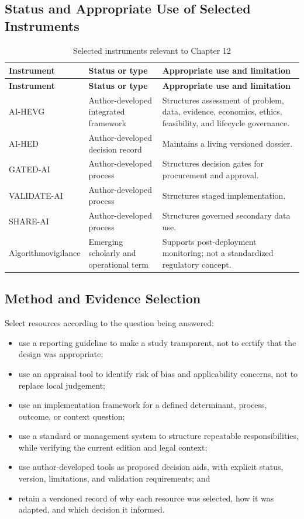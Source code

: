 \subsection{Status and Appropriate Use of Selected Instruments}
\begin{longtable}{@{}p{}p{}p{}@{}}
\caption{Selected instruments relevant to Chapter 12}
\label{tab:comp-ch12-instrument-status}\\
\toprule
\textbf{Instrument} & \textbf{Status or type} & \textbf{Appropriate use and limitation} \\
\midrule
\endfirsthead
\toprule
\textbf{Instrument} & \textbf{Status or type} & \textbf{Appropriate use and limitation} \\
\midrule
\endhead
\bottomrule
\endlastfoot
AI-HEVG & Author-developed integrated framework & Structures assessment of problem, data, evidence, economics, ethics, feasibility, and lifecycle governance. \\
AI-HED & Author-developed decision record & Maintains a living versioned dossier. \\
GATED-AI & Author-developed process & Structures decision gates for procurement and approval. \\
VALIDATE-AI & Author-developed process & Structures staged implementation. \\
SHARE-AI & Author-developed process & Structures governed secondary data use. \\
Algorithmovigilance & Emerging scholarly and operational term & Supports post-deployment monitoring; not a standardized regulatory concept. \\
\end{longtable}

\subsection{Method and Evidence Selection}
Select resources according to the question being answered:
\begin{itemize}
 \item use a reporting guideline to make a study transparent, not to certify that the design was appropriate;
 \item use an appraisal tool to identify risk of bias and applicability concerns, not to replace local judgement;
 \item use an implementation framework for a defined determinant, process, outcome, or context question;
 \item use a standard or management system to structure repeatable responsibilities, while verifying the current edition and legal context;
 \item use author-developed tools as proposed decision aids, with explicit status, version, limitations, and validation requirements; and
 \item retain a versioned record of why each resource was selected, how it was adapted, and which decision it informed.
\end{itemize}

